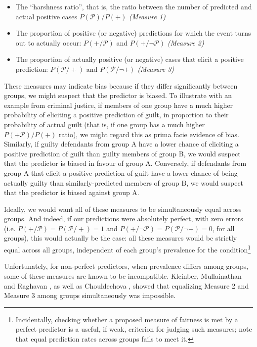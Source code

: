 \documentclass[twocolumn]{article}
\begin{document}
\begin{itemize}

\item The ``harshness ratio'', that is, the ratio between the number of predicted and
actual positive cases $P(\mathcal{P})/P(+)$ \emph{(Measure 1)}

\item The proportion of positive (or negative) predictions  for which the event
turns out to actually occur: $P(+ / \mathcal{P})$ and $P(+ / \neg \mathcal{P})$ \emph{(Measure 2)}

\item The proportion of actually positive (or negative) cases that elicit a
positive prediction: $P(\mathcal{P} / +)$ and $P(\mathcal{P} / \neg +)$ \emph{(Measure 3)}

\end{itemize}

These measures may indicate bias because if they differ significantly between
groups, we might suspect that the predictor is biased. To illustrate with an
example from criminal justice, if members of one group have a much higher
probability of eliciting a positive prediction of guilt, in proportion to
their probability of actual guilt (that is, if one group has a much higher
$P(+\mathcal{P}) / P(+)$ ratio), we might regard this as prima facie evidence of bias.
Similarly, if guilty defendants from group A have a lower chance of eliciting
a positive prediction of guilt than guilty members of group B, we would
suspect that the predictor is biased in favour of group A. Conversely, if
defendants from group A that elicit a positive prediction of guilt have a
lower chance of being actually guilty than similarly-predicted members of
group B, we would suspect that the predictor is biased against group A.

Ideally, we would want all of these measures to be simultaneously equal across
groups. And indeed, if our predictions were absolutely perfect, with zero
errors (i.e. $P(+/\mathcal{P})=P(\mathcal{P}/+)=1$ and $P(+/\neg \mathcal{P})=P(\mathcal{P}/ \neg +)=0$, for all groups),
this would actually be the case: all these measures would be strictly equal
across all groups, independent of each group's prevalence for the condition\footnote{Incidentally, checking whether a proposed measure of fairness is met by a perfect predictor is a useful, if weak, criterion for judging such measures; note that equal prediction rates across groups fails to meet it.}

Unfortunately, for non-perfect predictors, when prevalence differs among groups, some of these measures are known to be incompatible.  Kleinber, Mullainathan and Raghavan \cite{kleinberg2016inherent}, as well as Chouldechova \cite{chouldechova2017fair}, showed that equalizing Measure 2 and Measure 3 among groups simultaneously was impossible. 
\end{document}
